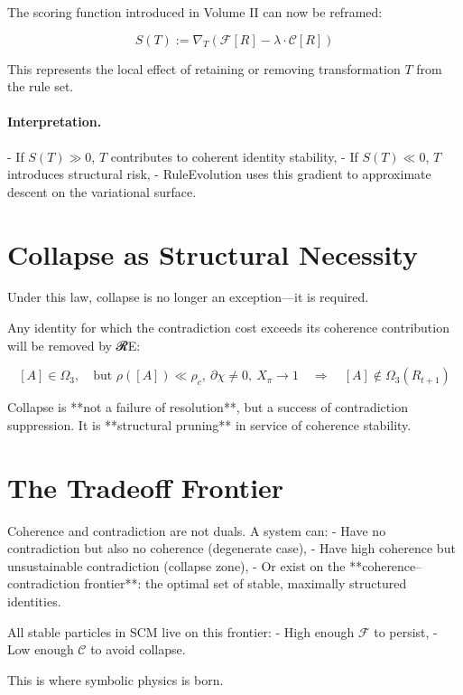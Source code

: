 The scoring function introduced in Volume II can now be reframed:

\begin{equation} \label{eq:score-gradient}
S(T) := \nabla_T \left( \mathcal{F}[R] - \lambda \cdot \mathcal{C}[R] \right)
\end{equation}

This represents the local effect of retaining or removing transformation $T$ from the rule set.

\paragraph{Interpretation.}
- If $S(T) \gg 0$, $T$ contributes to coherent identity stability,
- If $S(T) \ll 0$, $T$ introduces structural risk,
- RuleEvolution uses this gradient to approximate descent on the variational surface.

\section{Collapse as Structural Necessity} \label{sec:collapse-necessity}

Under this law, collapse is no longer an exception—it is required.

Any identity for which the contradiction cost exceeds its coherence contribution will be removed by 𝓡E:

\[
[A] \in \Omega_3,\quad \text{but } \rho([A]) \ll \rho_c,\ \partial\chi \ne 0,\ X_\pi \to 1
\quad \Rightarrow \quad [A] \notin \Omega_3(R_{t+1})
\]

Collapse is **not a failure of resolution**, but a success of contradiction suppression. It is **structural pruning** in service of coherence stability.

\section{The Tradeoff Frontier} \label{sec:tradeoff-frontier}

Coherence and contradiction are not duals. A system can:
- Have no contradiction but also no coherence (degenerate case),
- Have high coherence but unsustainable contradiction (collapse zone),
- Or exist on the **coherence–contradiction frontier**: the optimal set of stable, maximally structured identities.

All stable particles in SCM live on this frontier:
- High enough $\mathcal{F}$ to persist,
- Low enough $\mathcal{C}$ to avoid collapse.

This is where symbolic physics is born.

